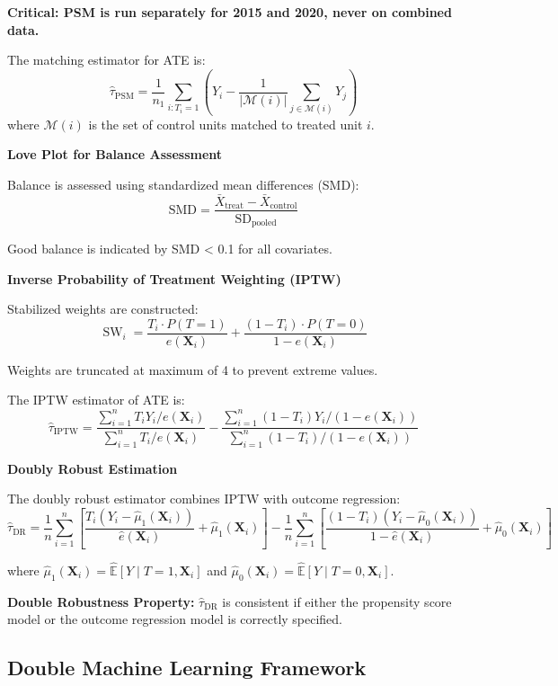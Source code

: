 \textbf{Critical: PSM is run separately for 2015 and 2020, never on combined data.}

The matching estimator for ATE is:
\[
\hat{\tau}_{\text{PSM}} = \frac{1}{n_1} \sum_{i: T_i=1} \left( Y_i - \frac{1}{|\mathcal{M}(i)|} \sum_{j \in \mathcal{M}(i)} Y_j \right)
\]
where $\mathcal{M}(i)$ is the set of control units matched to treated unit $i$.

\textbf{Love Plot for Balance Assessment}

Balance is assessed using standardized mean differences (SMD):
\[
\text{SMD} = \frac{\bar{X}_{\text{treat}} - \bar{X}_{\text{control}}}{\text{SD}_{\text{pooled}}}
\]

Good balance is indicated by SMD < 0.1 for all covariates.

\textbf{Inverse Probability of Treatment Weighting (IPTW)}

Stabilized weights \citep{cole2008constructing} are constructed:
\[
\operatorname{SW}_i = \frac{T_i \cdot P(T=1)}{e(\mathbf{X}_i)} + \frac{(1 - T_i) \cdot P(T=0)}{1 - e(\mathbf{X}_i)}
\]

Weights are truncated at maximum of 4 to prevent extreme values.

The IPTW estimator of ATE is:
\[
\hat{\tau}_{\text{IPTW}} = \frac{\sum_{i=1}^n T_i Y_i / e(\mathbf{X}_i)}{\sum_{i=1}^n T_i / e(\mathbf{X}_i)} - \frac{\sum_{i=1}^n (1 - T_i) Y_i / (1 - e(\mathbf{X}_i))}{\sum_{i=1}^n (1 - T_i) / (1 - e(\mathbf{X}_i))}
\]

\textbf{Doubly Robust Estimation}

The doubly robust estimator \citep{schafer2008average} combines IPTW with outcome regression:
\[
\hat{\tau}_{\text{DR}} = \frac{1}{n}\sum_{i=1}^{n}\left[\frac{T_i(Y_i - \hat{\mu}_1(\mathbf{X}_i))}{\hat{e}(\mathbf{X}_i)} + \hat{\mu}_1(\mathbf{X}_i)\right] - \frac{1}{n}\sum_{i=1}^{n}\left[\frac{(1-T_i)(Y_i - \hat{\mu}_0(\mathbf{X}_i))}{1 - \hat{e}(\mathbf{X}_i)} + \hat{\mu}_0(\mathbf{X}_i)\right]
\]

where $\hat{\mu}_1(\mathbf{X}_i) = \hat{\mathbb{E}}[Y \mid T=1, \mathbf{X}_i]$ and $\hat{\mu}_0(\mathbf{X}_i) = \hat{\mathbb{E}}[Y \mid T=0, \mathbf{X}_i]$.

\textbf{Double Robustness Property:} $\hat{\tau}_{\text{DR}}$ is consistent if either the propensity score model or the outcome regression model is correctly specified.

\subsection{Double Machine Learning Framework}

